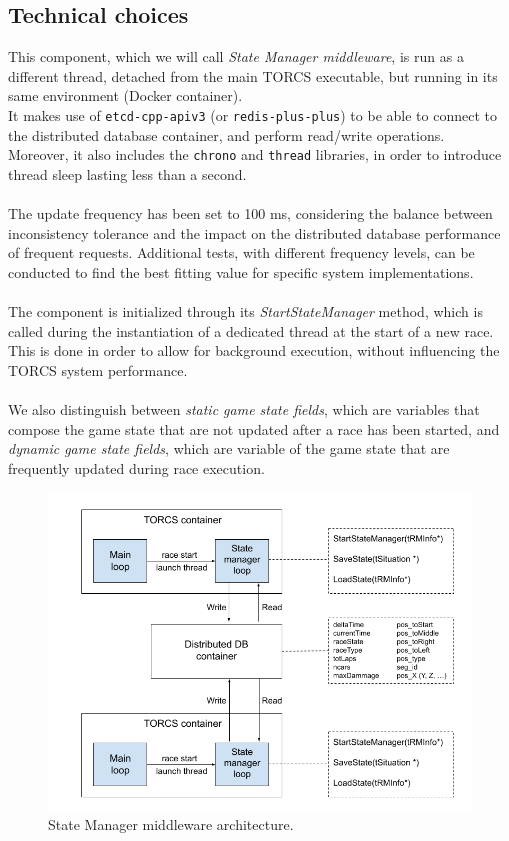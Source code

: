 \subsection{Technical choices}
This component, which we will call \textit{State Manager middleware}, is run as a different thread, detached from the main TORCS executable, but running in its same environment (Docker container). \\
It makes use of \texttt{etcd-cpp-apiv3} (or \texttt{redis-plus-plus}) to be able to connect to the distributed database container, and perform read/write operations. \\
Moreover, it also includes the \texttt{chrono} and \texttt{thread} libraries, in order to introduce thread sleep lasting less than a second. \\ \\
The update frequency has been set to 100 ms, considering the balance between inconsistency tolerance and the impact on the distributed database performance of frequent requests. Additional tests, with different frequency levels, can be conducted to find the best fitting value for specific system implementations. \\ \\
The component is initialized through its \textit{StartStateManager} method, which is called during the instantiation of a dedicated thread at the start of a new race. This is done in order to allow for background execution, without influencing the TORCS system performance. \\ \\
We also distinguish between \textit{static game state fields}, which are variables that compose the game state that are not updated after a race has been started, and \textit{dynamic game state fields}, which are variable of the game state that are frequently updated during race execution.

\begin{figure}
	\centering
	\includegraphics[width=0.9\linewidth]{"immagini/Software development/Game state manager"}
	\caption[State Manager middleware architecture.]{State Manager middleware architecture.}
	\label{fig:game-state-manager}
\end{figure}

